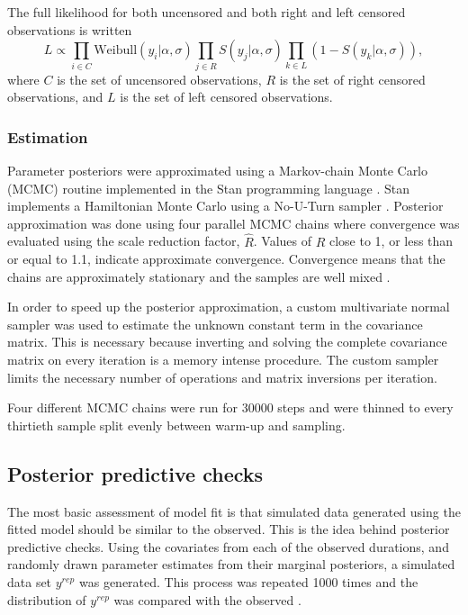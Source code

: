 \documentclass{article}
\begin{document}
The full likelihood for both uncensored and both right and left censored observations is written
\begin{equation*}
  L \propto \prod_{i \in C} \mathrm{Weibull}(y_{i} | \alpha, \sigma) \prod_{j \in R} S(y_j | \alpha, \sigma) \prod_{k \in L} \left(1 - S(y_{k} | \alpha, \sigma)\right),
\end{equation*}
where \(C\) is the set of uncensored observations, \(R\) is the set of right censored observations, and \(L\) is the set of left censored observations.



\subsubsection{Estimation}
Parameter posteriors were approximated using a Markov-chain Monte Carlo (MCMC) routine implemented in the Stan programming language \cite{2014stan}. Stan implements a Hamiltonian Monte Carlo using a No-U-Turn sampler \cite{Hoffman-Gelman:2011}. Posterior approximation was done using four parallel MCMC chains where convergence was evaluated using the scale reduction factor, \(\hat{R}\). Values of \(\hat{R}\) close to 1, or less than or equal to 1.1, indicate approximate convergence. Convergence means that the chains are approximately stationary and the samples are well mixed \cite{Gelman2013d}.

In order to speed up the posterior approximation, a custom multivariate normal sampler was used to estimate the unknown constant term in the covariance matrix. This is necessary because inverting and solving the complete covariance matrix on every iteration is a memory intense procedure. The custom sampler limits the necessary number of operations and matrix inversions per iteration.

Four different MCMC chains were run for 30000 steps and were thinned to every thirtieth sample split evenly between warm-up and sampling. 



\subsection{Posterior predictive checks}

The most basic assessment of model fit is that simulated data generated using the fitted model should be similar to the observed. This is the idea behind posterior predictive checks. Using the covariates from each of the observed durations, and randomly drawn parameter estimates from their marginal posteriors, a simulated data set \(y^{rep}\) was generated. This process was repeated 1000 times and the distribution of \(y^{rep}\) was compared with the observed \cite{Gelman2013d}.
\end{document}
